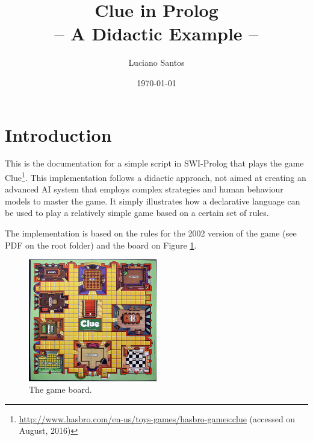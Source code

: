 \documentclass[12pt,a4paper]{article}
\title{Clue in Prolog\\{\Large -- A Didactic Example --}}
\author{Luciano Santos}
\date{\monthyeardate\today}
\begin{document}
\maketitle

\section{Introduction}

This is the documentation for a simple script in SWI-Prolog that plays the game Clue\footnote{\url{http://www.hasbro.com/en-us/toys-games/hasbro-games:clue} (accessed on August, 2016)}. This implementation follows a didactic approach, not aimed at creating an advanced AI system that employs complex strategies and human behaviour models to master the game. It simply illustrates how a declarative language can be used to play a relatively simple game based on a certain set of rules.

The implementation is based on the rules for the 2002 version of the game (see PDF on the root folder) and the board on Figure \ref{fig:board}.

\begin{figure}[H]
	\centering
	\includegraphics[width=0.5\textwidth]{board.jpg}
	\caption{The game board.}
	\label{fig:board}
\end{figure}
\end{document}
